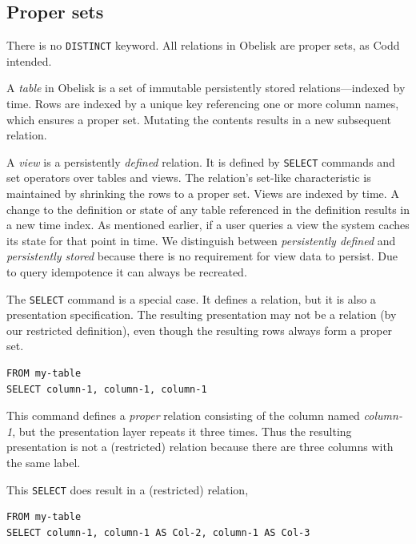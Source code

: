 \documentclass[twoside]{article}
\begin{document}
\subsection{Proper sets}

There is no \lstinline[style=inlinecode]{DISTINCT} keyword. All relations in Obelisk are proper sets, as Codd intended.

A \emph{table} in Obelisk is a set of immutable persistently stored relations---indexed by time. Rows are indexed by a unique key referencing one or more column names, which ensures a proper set. Mutating the contents results in a new subsequent relation.

A \emph{view} is a persistently \emph{defined} relation. It is defined by \lstinline[style=inlinecode]{SELECT} commands and set operators over tables and views. The relation's set-like characteristic is maintained by shrinking the rows to a proper set. Views are indexed by time. A change to the definition or state of any table referenced in the definition results in a new time index. As mentioned earlier, if a user queries a view the system caches its state for that point in time. We distinguish between \emph{persistently defined} and \emph{persistently stored} because there is no requirement for view data to persist. Due to query idempotence it can always be recreated.

\sloppy
The \lstinline[style=inlinecode]{SELECT} command is a special case. It defines a \mbox{relation}, but it is also a presentation specification. The resulting presentation may not be a relation (by our restricted definition), even though the resulting rows always form a proper set. %

\begin{lstlisting}[style=listingcode_sql]
FROM my-table
SELECT column-1, column-1, column-1
\end{lstlisting}

\noindent
This command defines a \emph{proper} relation consisting of the column named \emph{column-1}, but the presentation layer repeats it three times. Thus the resulting presentation is not a (restricted) relation because there are three columns with the same label.

This \lstinline[style=inlinecode]{SELECT} does result in a (restricted) relation,

\begin{lstlisting}[style=listingcode_sql]
FROM my-table
SELECT column-1, column-1 AS Col-2, column-1 AS Col-3
\end{lstlisting}
\end{document}

